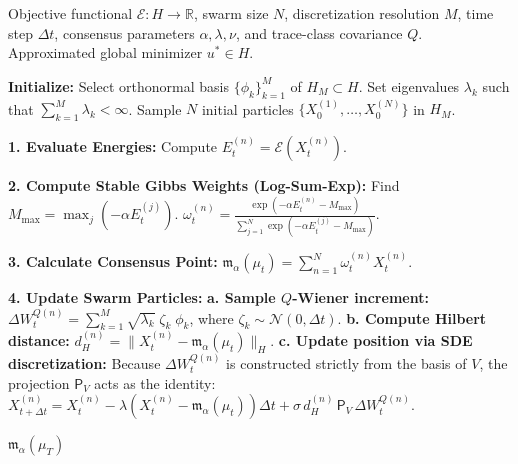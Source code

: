 \documentclass[12pt]{amsart}
\numberwithin{equation}{section}
\begin{document}
\begin{algorithm}
\caption{Consensus-Based Optimization in Hilbert Space $H$}
\label{alg:cbo_hilbert}
\begin{algorithmic}[1]
\REQUIRE Objective functional $\mathscr{E}: H \to \mathbb{R}$, swarm size $N$, discretization resolution $M$, time step $\Delta t$, consensus parameters $\alpha, \lambda, \nu$, and trace-class covariance $Q$.
\ENSURE Approximated global minimizer $u^* \in H$.

\bigskip

\STATE \textbf{Initialize:} 
\STATE Select orthonormal basis $\{\phi_k\}_{k=1}^M$ of $H_M \subset H$.
\STATE Set eigenvalues $\lambda_k$ such that $\sum_{k=1}^M \lambda_k < \infty$.
\STATE Sample $N$ initial particles $\{X_0^{(1)}, \dots, X_0^{(N)}\}$ in $H_M$.

\bigskip

    \STATE \textbf{1. Evaluate Energies:} 
        \STATE Compute $E_t^{(n)} = \mathscr{E}(X_t^{(n)})$.
    \ENDFOR

\bigskip

    \STATE \textbf{2. Compute Stable Gibbs Weights (Log-Sum-Exp):}
    \STATE Find $M_{\max} = \max_j (-\alpha E_t^{(j)})$.
        \STATE $\omega_t^{(n)} = \frac{\exp(-\alpha E_t^{(n)} - M_{\max})}{\sum_{j=1}^N \exp(-\alpha E_t^{(j)} - M_{\max})}$.
    \ENDFOR

\bigskip

    \STATE \textbf{3. Calculate Consensus Point:}
    \STATE $\mathfrak{m}_{\alpha}(\mu_t) = \sum_{n=1}^N \omega_t^{(n)} X_t^{(n)}$.

\bigskip

    \STATE \textbf{4. Update Swarm Particles:}
        \STATE \textbf{a. Sample $Q$-Wiener increment:}
        \STATE $\Delta W_t^{Q(n)} = \sum_{k=1}^M \sqrt{\lambda_k} \; \zeta_k\; \phi_k$, where $\zeta_k \sim \mathcal{N}(0, \Delta t)$.
        \STATE \textbf{b. Compute Hilbert distance:}
        \STATE $d_H^{(n)} = \|X_t^{(n)} - \mathfrak{m}_{\alpha}(\mu_t)\|_H$.
        \STATE \textbf{c. Update position via SDE discretization:}
        \STATE Because $\Delta W_t^{Q(n)}$ is constructed strictly from the basis of $V$, the projection $\mathsf{P}_V$ acts as the identity:
        \STATE $X_{t+\Delta t}^{(n)} = X_t^{(n)} - \lambda (X_t^{(n)} - \mathfrak{m}_{\alpha}(\mu_t)) \Delta t + \sigma\, d_H^{(n)}\, \mathsf{P}_V\, \Delta W_t^{Q(n)}$.
    \ENDFOR
\ENDFOR

\bigskip

\RETURN $\mathfrak{m}_{\alpha}(\mu_T)$
\end{algorithmic}
\end{algorithm}
\end{document}
